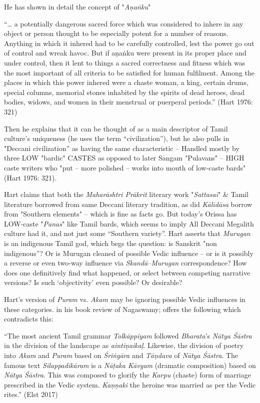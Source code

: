 He has shown in detail the concept of "\textit{Aṇaṅku}"

“… a potentially dangerous sacred force which was considered to inhere in any object or person thought to be especially potent for a number of reasons. Anything in which it inhered had to be carefully controlled, lest the power go out of control and wreak havoc. But if aṇaṅku were present in its proper place and under control, then it lent to things a sacred correctness and fitness which was the most important of all criteria to be satisfied for human fulfilment. Among the places in which this power inhered were a chaste woman, a king, certain drums, special columns, memorial stones inhabited by the spirits of dead heroes, dead bodies, widows, and women in their menstrual or puerperal periods.” (Hart 1976: 321)

Then he explains that it can be thought of as a main descriptor of Tamil culture’s uniqueness (he uses the term “civilization”), but he also pulls in "Deccani civilization” as having the same characteristic – Handled mostly by three LOW "bardic" CASTES as opposed to later Sangam "Pulavans" – HIGH caste writers who "put – more polished – works into mouth of low-caste bards" (Hart 1976: 321).

Hart claims that both the \textit{Maharāshtri Prākrit} literary work "\textit{Sattasaī}" \& Tamil literature borrowed from same Deccani literary tradition, as did \textit{Kālidāsa } borrow from "Southern elements" – which is fine as facts go. But today’s Orissa has LOW-caste "\textit{Panas}" like Tamil bards, which seems to imply All Deccani Megalith culture had it, and not just some “Southern variety”. Hart asserts that \textit{Murugan} is an indigenous Tamil god, which begs the question: is Sanskrit "non indigenous”? Or is Murugan cleaned of possible Vedic influence – or is it possibly a reverse or even two-way influence via \textit{Skandā}–\textit{Murugan} correspondence? How does one definitively find what happened, or select between competing narrative versions? Is such ‘objectivity’ even possible? Or desirable?

Hart’s version of \textit{Puram} vs. \textit{Akam} may be ignoring possible Vedic influences in these categories. in his book review of Nagaswamy; offers the following which contradicts this:

\begin{myquote}
“The most ancient Tamil grammar \textit{Tolkāppiyam} followed \textit{Bharata}’s \textit{Nātya Śāstra} in the division of the landscape as \textit{aintiṇaikaḷ}. Likewise, the division of poetry into \textit{Akam} and \textit{Puram} based on \textit{Śriṅgāra } and \textit{Tāṇdava } of \textit{Nātya Śāstra}. The famous text \textit{Silappadikāram} is a \textit{Nāṭaka Kāvyam} (dramatic composition) based on \textit{Nātya Śāstra}. This was composed to glorify the \textit{Karpu} (chaste) form of marriage prescribed in the Vedic system. \textit{Kaṇṇaki} the heroine was married as per the Vedic rites.” \hfill (Elst 2017)
\end{myquote}

